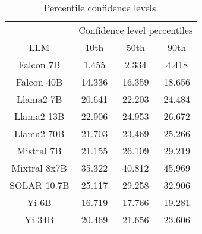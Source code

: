 \begin{table*}
\centering
\begin{tabular}{c|c|c|c}
& \multicolumn{3}{c}{Confidence level percentiles} \\ 
LLM & 10th & 50th & 90th\\ \hline
Falcon 7B & 1.455 & 2.334 & 4.418\\
Falcon 40B & 14.336 & 16.359 & 18.656\\
Llama2 7B & 20.641 & 22.203 & 24.484\\
Llama2 13B & 22.906 & 24.953 & 26.672\\
Llama2 70B & 21.703 & 23.469 & 25.266\\
Mistral 7B & 21.155 & 26.109 & 29.219\\
Mixtral 8x7B & 35.322 & 40.812 & 45.969\\
SOLAR 10.7B & 25.117 & 29.258 & 32.906\\
Yi 6B & 16.719 & 17.766 & 19.281\\
Yi 34B & 20.469 & 21.656 & 23.606\\
\hline
\end{tabular}
\caption{Percentile confidence levels.}
\label{tab:percentile_conf}
\end{table*}
